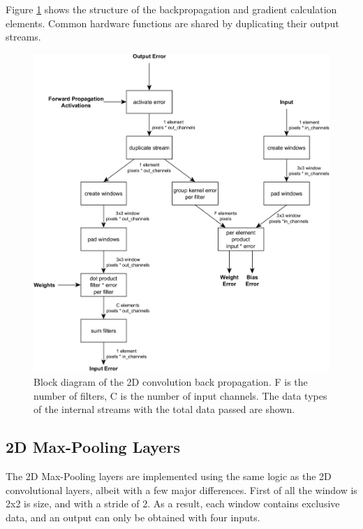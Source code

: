 Figure \ref{fig: Conv2D back propagation block diagram} shows the structure of the backpropagation and gradient calculation elements. Common hardware functions are shared by duplicating their output streams.

\begin{figure}[H]
    \centering
        \includegraphics[width=1\textwidth]{Images/block_diagrams/conv2d_bp_cg_mc.png}
        \decoRule
        \caption[Conv2D back propagation block diagram]{Block diagram of the 2D convolution back propagation. F is the number of filters, C is the number of input channels. The data types of the internal streams with the total data passed are shown. }
        \label{fig: Conv2D back propagation block diagram}
\end{figure}

\subsection{2D Max-Pooling Layers}
The 2D Max-Pooling layers are implemented using the same logic as the 2D convolutional layers, albeit with a few major differences. First of all the window is 2x2 is size, and with a stride of 2. As a result, each window contains exclusive data, and an output can only be obtained with four inputs.

